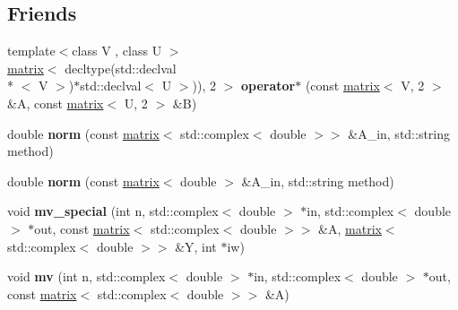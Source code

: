\subsection*{Friends}
\begin{DoxyCompactItemize}
\item 
\hypertarget{classkeycpp_1_1matrix_3_01_t_00_01dim_00_01_d_e_n_s_e___m_a_t_r_i_x_01_4_a5ac472827d5fe94db870bb5d8621509c}{{\footnotesize template$<$class V , class U $>$ }\\\hyperlink{classkeycpp_1_1matrix}{matrix}$<$ decltype(std\-::declval\\*
$<$ V $>$)$\ast$std\-::declval$<$ U $>$)), 2 $>$ {\bfseries operator$\ast$} (const \hyperlink{classkeycpp_1_1matrix}{matrix}$<$ V, 2 $>$ \&A, const \hyperlink{classkeycpp_1_1matrix}{matrix}$<$ U, 2 $>$ \&B)}\label{classkeycpp_1_1matrix_3_01_t_00_01dim_00_01_d_e_n_s_e___m_a_t_r_i_x_01_4_a5ac472827d5fe94db870bb5d8621509c}

\item 
\hypertarget{classkeycpp_1_1matrix_3_01_t_00_01dim_00_01_d_e_n_s_e___m_a_t_r_i_x_01_4_a9576607e2d20373518cd49262288e8bd}{double {\bfseries norm} (const \hyperlink{classkeycpp_1_1matrix}{matrix}$<$ std\-::complex$<$ double $>$$>$ \&A\-\_\-in, std\-::string method)}\label{classkeycpp_1_1matrix_3_01_t_00_01dim_00_01_d_e_n_s_e___m_a_t_r_i_x_01_4_a9576607e2d20373518cd49262288e8bd}

\item 
\hypertarget{classkeycpp_1_1matrix_3_01_t_00_01dim_00_01_d_e_n_s_e___m_a_t_r_i_x_01_4_aa9c5eb3f4a65db922dc9ab19469c465c}{double {\bfseries norm} (const \hyperlink{classkeycpp_1_1matrix}{matrix}$<$ double $>$ \&A\-\_\-in, std\-::string method)}\label{classkeycpp_1_1matrix_3_01_t_00_01dim_00_01_d_e_n_s_e___m_a_t_r_i_x_01_4_aa9c5eb3f4a65db922dc9ab19469c465c}

\item 
\hypertarget{classkeycpp_1_1matrix_3_01_t_00_01dim_00_01_d_e_n_s_e___m_a_t_r_i_x_01_4_a5b7d575d8ffa1780db174981167ffb7d}{void {\bfseries mv\-\_\-special} (int n, std\-::complex$<$ double $>$ $\ast$in, std\-::complex$<$ double $>$ $\ast$out, const \hyperlink{classkeycpp_1_1matrix}{matrix}$<$ std\-::complex$<$ double $>$$>$ \&A, \hyperlink{classkeycpp_1_1matrix}{matrix}$<$ std\-::complex$<$ double $>$$>$ \&Y, int $\ast$iw)}\label{classkeycpp_1_1matrix_3_01_t_00_01dim_00_01_d_e_n_s_e___m_a_t_r_i_x_01_4_a5b7d575d8ffa1780db174981167ffb7d}

\item 
\hypertarget{classkeycpp_1_1matrix_3_01_t_00_01dim_00_01_d_e_n_s_e___m_a_t_r_i_x_01_4_a084bb49e438644c7b787ca79a3ec2464}{void {\bfseries mv} (int n, std\-::complex$<$ double $>$ $\ast$in, std\-::complex$<$ double $>$ $\ast$out, const \hyperlink{classkeycpp_1_1matrix}{matrix}$<$ std\-::complex$<$ double $>$$>$ \&A)}\label{classkeycpp_1_1matrix_3_01_t_00_01dim_00_01_d_e_n_s_e___m_a_t_r_i_x_01_4_a084bb49e438644c7b787ca79a3ec2464}


\end{DoxyCompactItemize}
